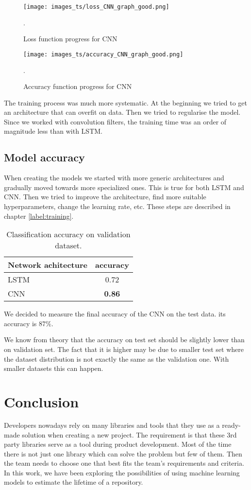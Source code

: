 \documentclass[thesis=M,english]{FITthesis}[2019/12/23]
\begin{document}
\begin{figure}[ht!]
    \centering
    \texttt{[image: images\_ts/loss\_CNN\_graph\_good.png]}
    \caption{Loss function progress for CNN}. 
    \label{figure:cnn_loss}
    \centering
\end{figure}

\begin{figure}[ht!]
    \centering
    \texttt{[image: images\_ts/accuracy\_CNN\_graph\_good.png]}
    \caption{Accuracy function progress for CNN}. 
    \label{figure:cnn_acc}
\end{figure}


The training process was much more systematic. At the beginning we tried to get an architecture that can overfit on data. Then we tried to regularise the model. Since we worked with convolution filters, the training time was an order of magnitude less than with LSTM.

\section{Model accuracy}
When creating the models we started with more generic architectures and gradually moved towards more specialized ones. This is true for both LSTM and CNN. Then we tried to improve the architecture, find more suitable hyperparameters, change the learning rate, etc. These steps are described in chapter \ref{label:training}.


\begin{table}[!ht]\centering
    \begin{tabular}{l|c}
         \textbf{Network achitecture} & \textbf{accuracy} \\\hline\hline
         LSTM & 0.72\\
         CNN & \textbf{0.86}\\
    \end{tabular}
    \caption{Classification accuracy on validation dataset.}
    \label{tab:bigger_models}
\end{table}

We decided to measure the final accuracy of the CNN on the test data. its accuracy is 87\%.

We know from theory that the accuracy on test set should be slightly lower than on validation set. The fact that it is higher may be due to smaller test set where the dataset distribution is not exactly the same as the validation one. With smaller datasets this can happen.

\chapter{Conclusion}
Developers nowadays rely on many libraries and tools that they use as a ready-made solution when creating a new project. The requirement is that these 3rd party libraries serve as a tool during product development. Most of the time there is not just one library which can solve the problem but few of them. Then the team needs to choose one that best fits the team's requirements and criteria. In this work, we have been exploring the possibilities of using machine learning models to estimate the lifetime of a repository.
\end{document}
